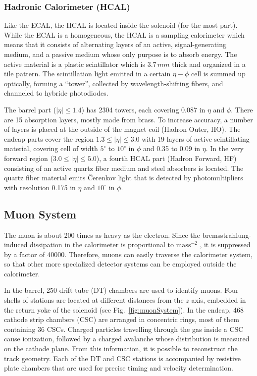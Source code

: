 \subsubsection*{Hadronic Calorimeter (HCAL)}
Like the ECAL, the HCAL is located inside the solenoid (for the most part). While the ECAL is a homogeneous, the HCAL is a sampling calorimeter which means that it consists of alternating layers of an active, signal-generating medium, and a passive medium whose only purpose is to absorb energy. The active material is a plastic scintillator which is $3.7\,\unit{mm}$ thick and organized in a tile pattern. The scintillation light emitted in a certain $\eta - \phi$ cell is summed up optically, forming a ``tower'', collected by wavelength-shifting fibers, and channeled to hybride photodiodes.

The barrel part ($|\eta| \leq 1.4$) has 2304 towers, each covering 0.087 in $\eta$ and $\phi$. There are 15 absorption layers, mostly made from brass. To increase accuracy, a number of layers is placed at the outside of the magnet coil (Hadron Outer, HO). The endcap parts cover the region $1.3 \leq |\eta| \leq 3.0$ with 19 layers of active scintillating material, covering cell of width $5^\circ$ to $10^\circ$ in $\phi$ and 0.35 to 0.09 in $\eta$. In the very forward region ($3.0 \leq |\eta| \leq 5.0$), a fourth HCAL part (Hadron Forward, HF) consisting of an active quartz fiber medium and steel absorbers is located. The quartz fiber material emits Čerenkov light that is detected by photomultipliers with resolution 0.175 in $\eta$ and $10^\circ$ in $\phi$.

\subsection{Muon System}
The muon is about 200 times as heavy as the electron. Since the bremsstrahlung-induced dissipation in the calorimeter is proportional to $\text{mass}^{-2}$ \cite{bock2013particle}, it is suppressed by a factor of 40000. Therefore, muons can easily traverse the calorimeter system, so that other more specialized detector systems can be employed outside the calorimeter.

In the barrel, 250 drift tube (DT) chambers are used to identify muons. Four shells of stations are located at different distances from the $z$ axis, embedded in the return yoke of the solenoid (see Fig.~\ref{fig:muonSystem}). In the endcap, 468 cathode strip chambers (CSC) are arranged in concentric rings, most of them containing 36 CSCs. Charged particles travelling through the gas inside a CSC cause ionization, followed by a charged avalanche whose distribution is measured on the cathode plane. From this information, it is possible to reconstruct the track geometry. Each of the DT and CSC stations is accompanied by resistive plate chambers that are used for precise timing and velocity determination.

